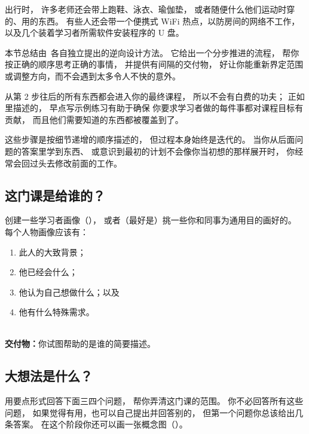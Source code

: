 出行时，
许多老师还会带上跑鞋、泳衣、瑜伽垫，
或者随便什么他们运动时穿的、用的东西。
有些人还会带一个便携式 WiFi 热点，以防房间的网络不工作，
以及几个装着学习者所需软件安装程序的 U 盘。


本节总结由~\cite{Wigg2005,Bigg2011,Fink2013}各自独立提出的逆向设计方法。
它给出一个分步推进的流程，
帮你按正确的顺序思考正确的事情，
并提供有间隔的交付物，
好让你能重新界定范围或调整方向，而不会遇到太多令人不快的意外。

从第 2 步往后的所有东西都会进入你的最终课程，
所以不会有白费的功夫；
正如里描述的，
早点写示例练习有助于确保
你要求学习者做的每件事都对课程目标有贡献，
而且他们需要知道的东西都被覆盖到了。

这些步骤是按细节递增的顺序描述的，
但过程本身始终是迭代的。
当你从后面问题的答案里学到东西、
或意识到最初的计划不会像你当初想的那样展开时，
你经常会回过头去修改前面的工作。

\subsection*{这门课是给谁的？}

创建一些学习者画像（），
或者（最好是）挑一些你和同事为通用目的画好的。
每个人物画像应该有：

\begin{enumerate}

\item
  此人的大致背景；

\item
  他已经会什么；

\item
  他认为自己想做什么；以及

\item
  他有什么特殊需求。

\end{enumerate}

~\\
\noindent
\textbf{交付物：}你试图帮助的是谁的简要描述。

\subsection*{大想法是什么？}

用要点形式回答下面三四个问题，
帮你弄清这门课的范围。
你不必回答所有这些问题，
如果觉得有用，也可以自己提出并回答别的，
但第一个问题你总该给出几条答案。
在这个阶段你还可以画一张概念图（）。

